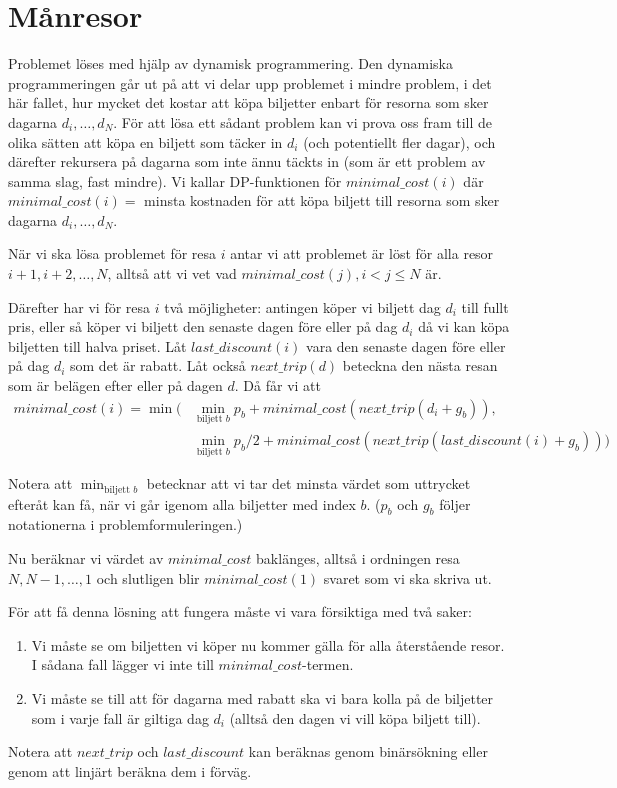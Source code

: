 \section{Månresor}
Problemet löses med hjälp av dynamisk programmering.
Den dynamiska programmeringen går ut på att vi delar upp problemet i mindre problem, i det här fallet, hur mycket det kostar att köpa biljetter enbart för resorna som sker dagarna $d_i, \dots, d_N$.
För att lösa ett sådant problem kan vi prova oss fram till de olika sätten att köpa en biljett som täcker in $d_i$ (och potentiellt fler dagar), och därefter rekursera på
dagarna som inte ännu täckts in (som är ett problem av samma slag, fast mindre).
Vi kallar DP-funktionen för $minimal\_cost(i)$ där $minimal\_cost(i)=$ minsta kostnaden för att köpa biljett till resorna som sker dagarna $d_i,\dots,d_N$. 

När vi ska lösa problemet för resa $i$ antar vi att problemet är löst för alla resor $i+1,i+2,\dots,N$, alltså att vi vet vad $minimal\_cost(j), i<j\leq N$ är.

Därefter har vi för resa $i$ två möjligheter: antingen köper vi biljett dag $d_i$ till fullt pris, eller så köper vi biljett den senaste dagen före eller på dag $d_i$ då vi kan köpa biljetten till halva priset.
Låt $last\_discount(i)$ vara den senaste dagen före eller på dag $d_i$ som det är rabatt.
Låt också $next\_trip(d)$ beteckna den nästa resan som är belägen efter eller på dagen $d$.
Då får vi att 
\begin{align*}
minimal\_cost(i) = \min(&\min_{\text{biljett }b} p_b+minimal\_cost(next\_trip(d_i+g_b)), \\
  &\min_{\text{biljett }b}p_b/2+minimal\_cost(next\_trip(last\_discount(i)+g_b)))
\end{align*}

Notera att $\min_{\text{biljett }b}$ betecknar att vi tar det minsta värdet som uttrycket efteråt kan få, när vi går igenom alla biljetter med index $b$. ($p_b$ och $g_b$ följer notationerna i problemformuleringen.)

Nu beräknar vi värdet av $minimal\_cost$ baklänges, alltså i ordningen resa $N,N-1,\dots,1$ och slutligen blir $minimal\_cost(1)$ svaret som vi ska skriva ut.

För att få denna lösning att fungera måste vi vara försiktiga med två saker:
\begin{enumerate}
  \item Vi måste se om biljetten vi köper nu kommer gälla för alla återstående resor. I sådana fall lägger vi inte till $minimal\_cost$-termen.
  \item Vi måste se till att för dagarna med rabatt ska vi bara kolla på de biljetter som i varje fall är giltiga dag $d_i$ (alltså den dagen vi vill köpa biljett till). 
\end{enumerate}

Notera att $next\_trip$ och $last\_discount$ kan beräknas genom binärsökning eller genom att linjärt beräkna dem i förväg.
